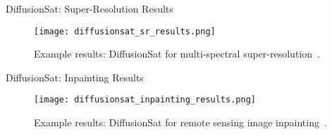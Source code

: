   \begin{refsection}
  \begin{frame}{DiffusionSat: Super-Resolution Results}
    \begin{figure}
      \centering
      \texttt{[image: diffusionsat\_sr\_results.png]}
      \caption[]{\scriptsize Example results: DiffusionSat for multi-spectral super-resolution~\parencite{diffusionset2024}.}
    \end{figure}
    \bottomleftrefs
  \end{frame}
  \end{refsection}
  
  \begin{refsection}
  \begin{frame}{DiffusionSat: Inpainting Results}
    \begin{figure}
      \centering
      \texttt{[image: diffusionsat\_inpainting\_results.png]}
      \caption[]{\scriptsize Example results: DiffusionSat for remote sensing image inpainting~\parencite{diffusionset2024}.}
    \end{figure}
    \bottomleftrefs
  \end{frame}
  \end{refsection}

 